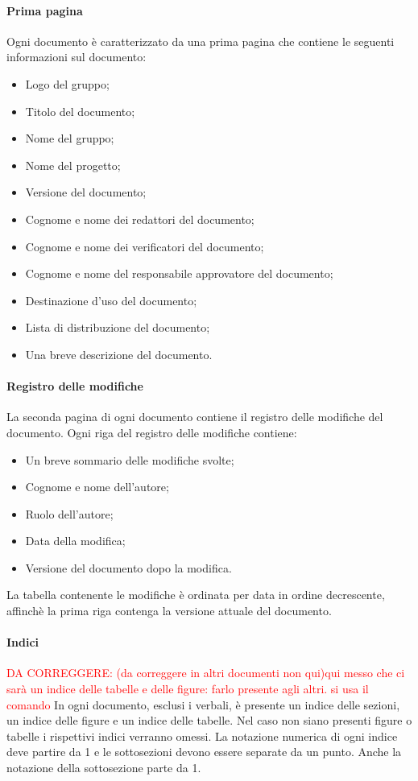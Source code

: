 		\paragraph{Prima pagina}\Spazio
		Ogni documento è caratterizzato da una prima pagina che contiene le seguenti informazioni sul documento:
		\begin{itemize}
			\item Logo del gruppo;
			\item Titolo del documento;
			\item Nome del gruppo;
			\item Nome del progetto;
			\item Versione del documento;
			\item Cognome e nome dei redattori del documento;
			\item Cognome e nome dei verificatori del documento;
			\item Cognome e nome del responsabile approvatore del documento;
			\item Destinazione d’uso del documento;
			\item Lista di distribuzione del documento;
			\item Una breve descrizione del documento.
		\end{itemize}
	
		\paragraph{Registro delle modifiche} \Spazio
		\label{registroModifiche}
		La seconda pagina di ogni documento contiene il registro delle modifiche del documento.
		Ogni riga del registro delle modifiche contiene:
		\begin{itemize}
			\item Un breve sommario delle modifiche svolte;
			\item Cognome e nome dell’autore;
			\item Ruolo dell’autore;
			\item Data della modifica;
			\item Versione del documento dopo la modifica.
		\end{itemize}
		La tabella contenente le modifiche è ordinata per data in ordine decrescente, affinchè la prima riga contenga la versione attuale del documento.
		
		\paragraph{Indici} \Spazio
		\textcolor{red}{DA CORREGGERE: (da correggere in altri documenti non qui)qui messo che ci sarà un indice  delle tabelle e delle figure: farlo presente agli altri. si usa il comando}
		In ogni documento, esclusi i verbali, è presente un indice delle sezioni, un indice delle figure e un indice delle tabelle. Nel caso non siano presenti figure o tabelle i rispettivi indici verranno omessi. La notazione numerica di ogni indice deve partire da 1 e le sottosezioni devono essere separate da un punto. Anche la notazione della sottosezione parte da 1.
		
